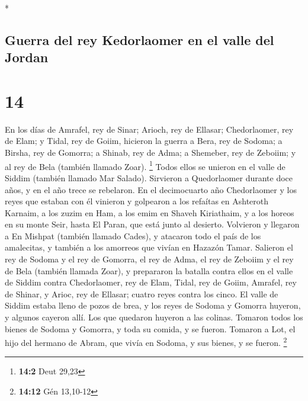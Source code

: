 \begin{paracol}{2}
\begin{otherlanguage}{english}
\end{otherlanguage}

\switchcolumn[0]*

\hypertarget{guerra-del-rey-kedorlaomer-en-el-valle-del-jordan}{%
\subsection{Guerra del rey Kedorlaomer en el valle del
Jordan}\label{guerra-del-rey-kedorlaomer-en-el-valle-del-jordan}}

\hypertarget{section-26}{%
\section{14}\label{section-26}}

 En los días de Amrafel, rey de Sinar; Arioch, rey de
Ellasar; Chedorlaomer, rey de Elam; y Tidal, rey de Goiim,
 hicieron la guerra a Bera, rey de Sodoma; a Birsha, rey
de Gomorra; a Shinab, rey de Adma; a Shemeber, rey de Zeboiim; y al rey
de Bela (también llamado Zoar). \footnote{\textbf{14:2} Deut 29,23}
 Todos ellos se unieron en el valle de Siddim (también
llamado Mar Salado).  Sirvieron a Quedorlaomer durante
doce años, y en el año trece se rebelaron.  En el
decimocuarto año Chedorlaomer y los reyes que estaban con él vinieron y
golpearon a los refaítas en Ashteroth Karnaim, a los zuzim en Ham, a los
emim en Shaveh Kiriathaim,  y a los horeos en su monte
Seir, hasta El Paran, que está junto al desierto. 
Volvieron y llegaron a En Mishpat (también llamado Cades), y atacaron
todo el país de los amalecitas, y también a los amorreos que vivían en
Hazazón Tamar.  Salieron el rey de Sodoma y el rey de
Gomorra, el rey de Adma, el rey de Zeboiim y el rey de Bela (también
llamada Zoar), y prepararon la batalla contra ellos en el valle de
Siddim  contra Chedorlaomer, rey de Elam, Tidal, rey de
Goiim, Amrafel, rey de Shinar, y Arioc, rey de Ellasar; cuatro reyes
contra los cinco.  El valle de Siddim estaba lleno de
pozos de brea, y los reyes de Sodoma y Gomorra huyeron, y algunos
cayeron allí. Los que quedaron huyeron a las colinas. 
Tomaron todos los bienes de Sodoma y Gomorra, y toda su comida, y se
fueron.  Tomaron a Lot, el hijo del hermano de Abram, que
vivía en Sodoma, y sus bienes, y se fueron. \footnote{\textbf{14:12} Gén
  13,10-12}

\hypertarget{ayuda-de-abram-por-lot}{%
}
\end{paracol}
